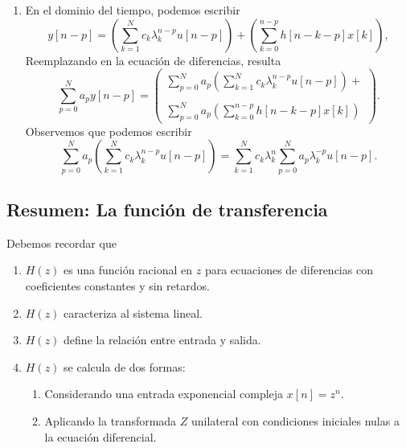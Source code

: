 \begin{enumerate}
\item En el dominio del tiempo, podemos escribir
\begin{equation}
   y[n-p] = 
       \left( \sum_{k=1}^{N} c_{k} \lambda_{k}^{n-p} u[n-p] \right) +
       \left( \sum_{k=0}^{n-p} h[n-k-p] x[k] \right),
\end{equation}
Reemplazando en la ecuaci\'{o}n de diferencias, resulta
\begin{equation}
   \sum_{p=0}^{N}a_{p}y\left[ n-p\right] =
   \left( \begin{array}{c}
       \sum_{p=0}^{N}a_{p}
       \left( \sum_{k=1}^{N} c_{k} \lambda_{k}^{n-p} u[n-p] \right) + \\
       \\
       \sum_{p=0}^{N}a_{p}
       \left( \sum_{k=0}^{n-p} h[n-k-p] x[k] \right)
 \end{array} \right).
\end{equation}
Observemos que podemos escribir
\begin{equation}
  \sum_{p=0}^{N}a_{p}
  \left( \sum_{k=1}^{N} c_{k} \lambda_{k}^{n-p} u[n-p] \right) =
  \sum_{k=1}^{N} c_{k} \lambda_{k}^{n} \sum_{p=0}^{N} a_{p} \lambda_{k}^{-p} u[n-p].
\end{equation}

\end{enumerate}

\subsection{Resumen: La funci\'{o}n de transferencia}

Debemos recordar que
\begin{enumerate}
\item   $H(z)$ es una funci\'{o}n racional en $z$ para ecuaciones de diferencias con coeficientes
  constantes y sin retardos.
  
\item   $H(z)$ caracteriza al sistema lineal.
  
\item   $H(z)$ define la relaci\'{o}n entre entrada y salida.
  
\item   $H(z)$ se calcula de dos formas:
  \begin{enumerate}
  \item Considerando una entrada exponencial compleja $x[n] = z^{n}$.
  \item Aplicando la transformada $Z$ unilateral con condiciones iniciales nulas a 
    la ecuaci\'{o}n diferencial.
  \end{enumerate}
\end{enumerate}

